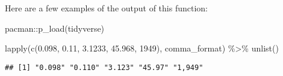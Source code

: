 \documentclass[
]{book}
\newenvironment{Shaded}{\begin{snugshade}}{\end{snugshade}}
\newcommand{\DecValTok}[1]{\textcolor[rgb]{0.00,0.00,0.81}{#1}}
\newcommand{\FloatTok}[1]{\textcolor[rgb]{0.00,0.00,0.81}{#1}}
\newcommand{\FunctionTok}[1]{\textcolor[rgb]{0.00,0.00,0.00}{#1}}
\newcommand{\NormalTok}[1]{#1}
\newcommand{\SpecialCharTok}[1]{\textcolor[rgb]{0.00,0.00,0.00}{#1}}
\begin{document}
Here are a few examples of the output of this function:

\begin{Shaded}
\begin{Highlighting}[]
\NormalTok{pacman}\SpecialCharTok{::}\FunctionTok{p\_load}\NormalTok{(tidyverse)}

\FunctionTok{lapply}\NormalTok{(}\FunctionTok{c}\NormalTok{(}\FloatTok{0.098}\NormalTok{, }\FloatTok{0.11}\NormalTok{, }\FloatTok{3.1233}\NormalTok{, }\FloatTok{45.968}\NormalTok{, }\DecValTok{1949}\NormalTok{), comma\_format) }\SpecialCharTok{\%\textgreater{}\%} \FunctionTok{unlist}\NormalTok{()}
\end{Highlighting}
\end{Shaded}

\begin{verbatim}
## [1] "0.098" "0.110" "3.123" "45.97" "1,949"
\end{verbatim}

  
\end{document}
